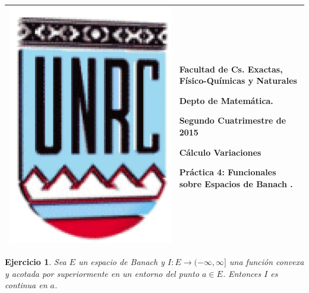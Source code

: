 \documentclass{article}
\newcounter{ejer}
\newtheorem{ejercicio}[ejer]{Ejercicio}}
\begin{document}
\setlength{\unitlength}{1cm}
%
\setlength{\extrarowheight}{5mm}
%

\setlength{\extrarowheight}{-5mm}
\noindent\begin{tabular}{m{} m{}}\hline\hline
\medskip

\includegraphics[scale=0.3]{imagenes/unrc.jpg} &
\begin{bfseries}  \begin{scshape}
Facultad de Cs. Exactas, Físico-Químicas y Naturales\par
        Depto de Matem\'atica.\par
        Segundo Cuatrimestre de 2015\par
        Cálculo Variaciones \par

        Práctica 4: Funcionales sobre Espacios de Banach .
				\end{scshape}
\end{bfseries}
\\
\hline\hline
\end{tabular}
\renewcommand{\theenumi}{\alph{enumi}}


\begin{ejercicio} Sea $E$ un espacio de Banach 
y $I:E\to (-\infty,\infty]$ una función convexa y acotada por superiormente  en 
un entorno del punto $a\in E$.  Entonces  $I$ es continua en $a$. 

\end{ejercicio}
\end{document}
